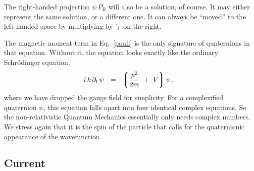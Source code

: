 \documentclass[epsfig,12pt]{article}
\newcommand{\p}{\partial}
\newcommand{\lgr}{\left\lgroup}
\newcommand{\rgr}{\right\rgroup}
\newcommand{\jj}{\hat\jmath}
\begin{document}
	The right-handed projection $ \psi\,P_R $ will also be a solution, of course.
	It may either represent the same solution, or a different one.
	It can always be ``moved'' to the left-handed space by multiplying by $ \jj $
	on the right.

	The magnetic moment term in Eq.~\eqref{pauli} is the only signature of quaternions
	in that equation.
	Without it, the equation looks exactly like the ordinary Schr\"odinger equation,
\begin{equation}
\label{simple-schrod}
	i\,\hbar\,\p_t\,\psi	~~=~~
		\lgr
			\frac {p^2} {2m}
			~+~  V
		\rgr \psi\,,
\end{equation}
	where we have dropped the gauge field for simplicity.
	For a complexified quaternion $ \psi $, this equation falls apart into four
	identical complex equations.
	So the non-relativistic Quantum Mechanics essentially only needs complex numbers.
	We stress again that it is the spin of the particle that calls for the
	quaternionic appearance of the wavefunction.
	

\subsection{Current}
\label{sec-current}
\end{document}
